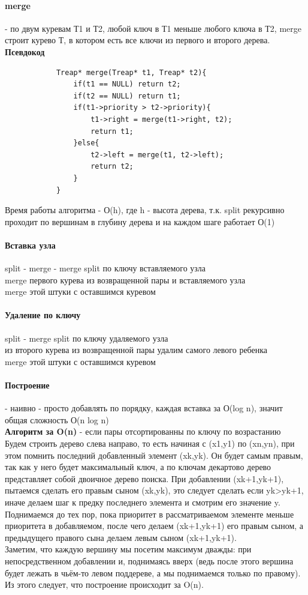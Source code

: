 \documentclass[a4paper,10pt]{article}
\begin{document}
\paragraph{merge} - по двум куревам Т1 и Т2, любой ключ в Т1 меньше любого ключа в Т2, merge строит курево Т, в котором есть все ключи из первого и второго дерева.\\
\textbf{Псевдокод}\\
\begin{center}
		\begin{lstlisting}
			Treap* merge(Treap* t1, Treap* t2){
				if(t1 == NULL) return t2;
				if(t2 == NULL) return t1;
				if(t1->priority > t2->priority){
					t1->right = merge(t1->right, t2);
					return t1;
				}else{
					t2->left = merge(t1, t2->left);
					return t2;
				}
			}
		\end{lstlisting}
	\end{center}
Время работы алгоритма - О(h), где h - высота дерева, т.к. split рекурсивно проходит по вершинам в глубину дерева и на каждом шаге работает О(1)
\paragraph{Вставка узла} split - merge - merge
split по ключу вставляемого узла\\
merge первого курева из возвращенной пары и вставляемого узла\\
merge этой штуки  с оставшимся куревом
\paragraph{Удаление по ключу} split - merge
split по ключу удаляемого узла\\
из второго курева из возвращенной пары удалим самого левого ребенка\\
merge этой штуки  с оставшимся куревом
\paragraph{Построение} - наивно - просто добавлять по порядку, каждая вставка за  О(log n), значит общая сложность  О(n log n)\\

\textbf{Алгоритм за O(n)} - если пары отсортированны по ключу по возрастанию\\
Будем строить дерево слева направо, то есть начиная с (x1,y1) по (xn,yn), при этом помнить последний добавленный элемент (xk,yk). Он будет самым правым, так как у него будет максимальный ключ, а по ключам декартово дерево представляет собой двоичное дерево поиска. При добавлении (xk+1,yk+1), пытаемся сделать его правым сыном (xk,yk), это следует сделать если yk>yk+1, иначе делаем шаг к предку последнего элемента и смотрим его значение y. Поднимаемся до тех пор, пока приоритет в рассматриваемом элементе меньше приоритета в добавляемом, после чего делаем (xk+1,yk+1) его правым сыном, а предыдущего правого сына делаем левым сыном (xk+1,yk+1).\\
Заметим, что каждую вершину мы посетим максимум дважды: при непосредственном добавлении и, поднимаясь вверх (ведь после этого вершина будет лежать в чьём-то левом поддереве, а мы поднимаемся только по правому). Из этого следует, что построение происходит за O(n).
\end{document}
